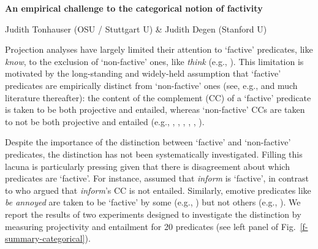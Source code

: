 \documentclass[12pt,fleqn]{article}
\newcommand{\6}{\mbox{$[\hspace*{-.6mm}[$}}
\newcommand{\9}{\mbox{$]\hspace*{-.6mm}]$}}
\begin{document}
  
\begin{center}
{\bf An empirical challenge to the categorical notion of factivity}

Judith Tonhauser (OSU / Stuttgart U) \& Judith Degen (Stanford U) 
\end{center}

\vspace*{-.19cm}


\noindent
Projection analyses have largely limited their attention to `factive' predicates, like {\em know}, to the exclusion of `non-factive' ones, like {\em think}  (e.g., \cite{heim83,vds92,abrusan2011,abrusan2016,romoli2015,best-question}). This limitation is motivated by the long-standing and widely-held assumption that `factive' predicates are empirically distinct from `non-factive' ones (see, e.g., \cite{karttunen71b,kiparsky-kiparsky71} and much literature thereafter): the content of the complement (CC) of a `factive' predicate is taken to be both projective and entailed, whereas `non-factive' CCs  are taken to not be both projective and entailed  (e.g., \cite{gazdar79a}, \cite{ccmg90}, \cite{vds92},  \cite{schlenker10}, \cite{anand-hacquard2014}, \cite{spector-egre2015}). 

Despite the importance of the distinction between `factive' and `non-factive' predicates, the distinction has not been systematically investigated. Filling this lacuna is particularly pressing given that there is disagreement about which predicates are `factive'. For instance, \cite{schlenker10} assumed that {\em inform} is `factive', in contrast to \cite{anand-hacquard2014} who argued that \emph{inform}'s CC is not entailed. Similarly, emotive predicates like {\em be annoyed} are taken to be `factive' by some (e.g., \cite{gazdar79a,abrusan2011,anand-hacquard2014}) but not others (e.g., \cite{klein1975,giannakidou1998,schlenker2003,egre2008}). We report the results of two experiments designed to investigate the distinction by measuring projectivity and entailment for 20 predicates (see left panel of Fig.\ \ref{f-summary-categorical}). %
\end{document}
